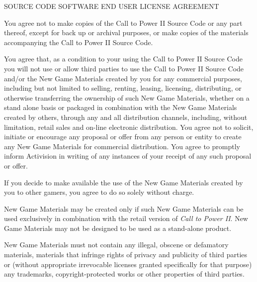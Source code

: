 \begin{section}{SOURCE CODE SOFTWARE END USER LICENSE AGREEMENT}
\begin{flushleft}
{\footnotesize 	You agree not to make copies of the Call to Power II Source Code or any part thereof, except for back up or archival purposes, or make copies of the materials accompanying the Call to Power II Source Code.}
\end{flushleft}


\begin{flushleft}
{\footnotesize 	You agree that, as a condition to your using the Call to Power II Source Code you will not use or allow third parties to use the Call to Power II Source Code and/or the New Game Materials created by you for any commercial purposes, including but not limited to selling, renting, leasing, licensing, distributing, or otherwise transferring the ownership of such New Game Materials, whether on a stand alone basis or packaged in combination with the New Game Materials created by others, through any and all distribution channels, including, without limitation, retail sales and on-line electronic distribution.  You agree not to solicit, initiate or encourage any proposal or offer from any person or entity to create any New Game Materials for commercial distribution. You agree to promptly inform Activision in writing of any instances of your receipt of any such proposal or offer.}
\end{flushleft}


\begin{flushleft}
{\footnotesize 	If you decide to make available the use of the New Game Materials created by you to other gamers, you agree to do so solely without charge. }
\end{flushleft}


\begin{flushleft}
{\footnotesize 	New Game Materials may be created only if such New Game Materials can be used exclusively in combination with the retail version of }\textit{{\footnotesize Call to Power II}}{\footnotesize .  New Game Materials may not be designed to be used as a stand-alone product.}
\end{flushleft}


\begin{flushleft}
{\footnotesize 	New Game Materials must not contain any illegal, obscene or defamatory materials, materials that infringe rights of privacy and publicity of third parties or (without appropriate irrevocable licenses granted specifically for that purpose) any trademarks, copyright-protected works or other properties of third parties.}
\end{flushleft}



\end{section}
